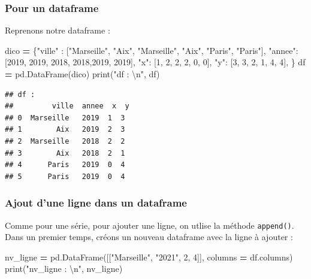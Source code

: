 \documentclass[12pt,]{book}
\newenvironment{Shaded}{\begin{snugshade}}{\end{snugshade}}
\newcommand{\DecValTok}[1]{\textcolor[rgb]{0.00,0.00,0.81}{#1}}
\newcommand{\CharTok}[1]{\textcolor[rgb]{0.31,0.60,0.02}{#1}}
\newcommand{\StringTok}[1]{\textcolor[rgb]{0.31,0.60,0.02}{#1}}
\newcommand{\OperatorTok}[1]{\textcolor[rgb]{0.81,0.36,0.00}{\textbf{#1}}}
\newcommand{\BuiltInTok}[1]{#1}
\newcommand{\NormalTok}[1]{#1}
\numberwithin{equation}{section}
\numberwithin{countremarque}{section}
\begin{document}
\subsubsection{Pour un dataframe}\label{pour-un-dataframe-1}

Reprenons notre dataframe :

\begin{Shaded}
\begin{Highlighting}[]
\NormalTok{dico }\OperatorTok{=}\NormalTok{ \{}\StringTok{"ville"}\NormalTok{ : [}\StringTok{"Marseille"}\NormalTok{, }\StringTok{"Aix"}\NormalTok{,}
                   \StringTok{"Marseille"}\NormalTok{, }\StringTok{"Aix"}\NormalTok{, }\StringTok{"Paris"}\NormalTok{, }\StringTok{"Paris"}\NormalTok{],}
        \StringTok{"annee"}\NormalTok{: [}\DecValTok{2019}\NormalTok{, }\DecValTok{2019}\NormalTok{, }\DecValTok{2018}\NormalTok{, }\DecValTok{2018}\NormalTok{,}\DecValTok{2019}\NormalTok{, }\DecValTok{2019}\NormalTok{],}
        \StringTok{"x"}\NormalTok{: [}\DecValTok{1}\NormalTok{, }\DecValTok{2}\NormalTok{, }\DecValTok{2}\NormalTok{, }\DecValTok{2}\NormalTok{, }\DecValTok{0}\NormalTok{, }\DecValTok{0}\NormalTok{],}
        \StringTok{"y"}\NormalTok{: [}\DecValTok{3}\NormalTok{, }\DecValTok{3}\NormalTok{, }\DecValTok{2}\NormalTok{, }\DecValTok{1}\NormalTok{, }\DecValTok{4}\NormalTok{, }\DecValTok{4}\NormalTok{],}
\NormalTok{       \} }
\NormalTok{df }\OperatorTok{=}\NormalTok{ pd.DataFrame(dico)}
\BuiltInTok{print}\NormalTok{(}\StringTok{"df : }\CharTok{\textbackslash{}n}\StringTok{"}\NormalTok{, df)}
\end{Highlighting}
\end{Shaded}

\begin{lstlisting}
## df : 
##         ville  annee  x  y
## 0  Marseille   2019  1  3
## 1        Aix   2019  2  3
## 2  Marseille   2018  2  2
## 3        Aix   2018  2  1
## 4      Paris   2019  0  4
## 5      Paris   2019  0  4
\end{lstlisting}

\subsubsection{Ajout d'une ligne dans un
dataframe}\label{ajout-dune-ligne-dans-un-dataframe}

Comme pour une série, pour ajouter une ligne, on utlise la méthode
\texttt{append()}. Dans un premier temps, créons un nouveau dataframe
avec la ligne à ajouter :

\begin{Shaded}
\begin{Highlighting}[]
\NormalTok{nv_ligne }\OperatorTok{=}\NormalTok{ pd.DataFrame([[}\StringTok{"Marseille"}\NormalTok{, }\StringTok{"2021"}\NormalTok{, }\DecValTok{2}\NormalTok{, }\DecValTok{4}\NormalTok{]],}
\NormalTok{                       columns }\OperatorTok{=}\NormalTok{ df.columns)}
\BuiltInTok{print}\NormalTok{(}\StringTok{"nv_ligne : }\CharTok{\textbackslash{}n}\StringTok{"}\NormalTok{, nv_ligne)}
\end{Highlighting}
\end{Shaded}
\end{document}
